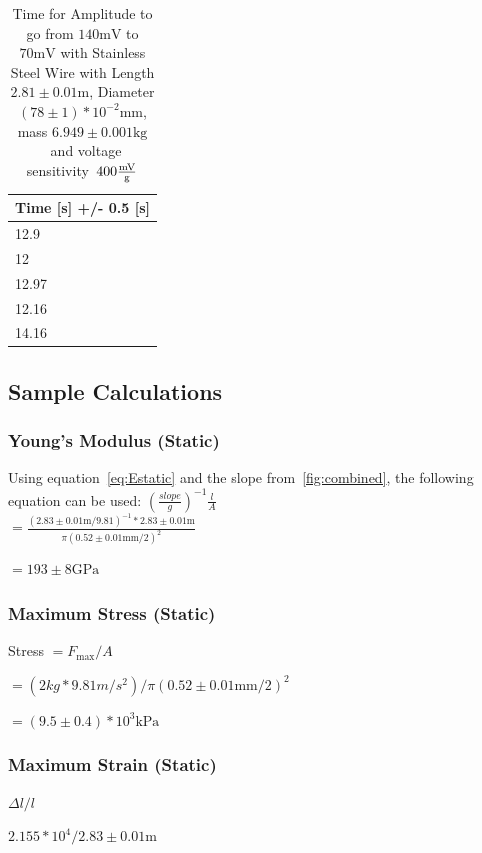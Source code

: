 \documentclass[]{article}
\newcommand{\staticWireDiameter}{\ensuremath{0.52 \pm 0.01 \si{\milli\meter}}}
\newcommand{\staticWireLength}{\ensuremath{2.83 \pm 0.01 \si{\meter}}}
\newcommand{\Estatic}{\ensuremath{193 \pm 8 \si{\giga\pascal}}}
\newcommand{\stressMax}{\ensuremath{(9.5 \pm 0.4)*10^{3} \si{\kilo\pascal}}}
\newcommand{\dynamicWireDiameter}{\ensuremath{(78 \pm 1)*10^{-2} \si{\milli\meter}}}
\newcommand{\dynamicWireLength}{\ensuremath{2.81 \pm 0.01 \si{\meter}}}
\newcommand{\M}{\ensuremath{6.949 \pm 0.001\si{\kilo\gram}}}
\newcommand{\sensitivity}{\ensuremath{400\si{\frac{\milli\volt}{g}}}}
\begin{document}
\begin{table}[H]
    \centering
    \caption{Time for Amplitude to go from $140\si{\milli\volt}$ to
    $70\si{\milli\volt}$ with Stainless Steel Wire with Length
    \dynamicWireLength, Diameter \dynamicWireDiameter, mass \M~and voltage
    sensitivity~\sensitivity}\label{tab:half}
    \begin{tabular}{@{}l@{}}
        \toprule
        Time {[}s{]} +/- 0.5 {[}s{]} \\ \midrule
        12.9                         \\
        12                           \\
        12.97                        \\
        12.16                        \\
        14.16                        \\ \bottomrule
    \end{tabular}
\end{table}

\subsection{Sample Calculations}
\subsubsection{Young's Modulus (Static)}
Using equation~\ref{eq:Estatic} and the slope from~\ref{fig:combined}, the
following equation can be used: ${(\frac{slope}{g})}^{-1} \frac{l}{A}$\\

$= \frac{(\staticWireLength/9.81)^{-1}*\staticWireLength}{\pi{(\staticWireDiameter/2)}^2} $

$= \Estatic$


\subsubsection{Maximum Stress (Static)}
Stress $ = F_{\max}/A$

$= (2 kg * 9.81 m/s^2)/\pi{(\staticWireDiameter/2)}^2$

$= \stressMax$

\subsubsection{Maximum Strain (Static)}
$\Delta l/l$

$2.155*10^4/\staticWireLength$
\end{document}

